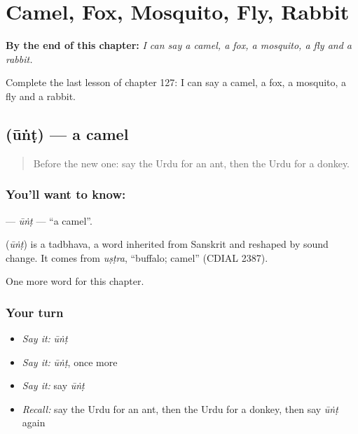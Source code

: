 
\chapter{Camel, Fox, Mosquito, Fly, Rabbit}
\label{ch:ur-camel-fox-mosquito-fly-rabbit}

\begin{chapteropening}
\textbf{By the end of this chapter:} \emph{I can say a camel, a fox, a mosquito, a fly and a rabbit.}

Complete the last lesson of chapter 127: I can say a camel, a fox, a mosquito, a fly and a rabbit.
\end{chapteropening}

\section[\texorpdfstring{\ur{اونٹ} (ūṅṭ)}{اونٹ (ūṅṭ)}]{ (ūṅṭ) — a camel}

\label{lesson:UR-C127-unt}



\begin{quote}
Before the new one: say the Urdu for an ant, then the Urdu for a donkey.
\end{quote}

\subsection*{You'll want to know: }
\textbf{} — \emph{ūṅṭ} — \textquotedblleft{}a camel\textquotedblright{}.

\begin{cousinweb}
\textbf{} (\emph{ūṅṭ}) is a tadbhava, a word inherited from Sanskrit and reshaped by sound change. It comes from \emph{uṣṭra}, \textquotedblleft{}buffalo; camel\textquotedblright{} (CDIAL 2387).
\end{cousinweb}

\begin{grammarlens}[title={What you've built}]
One more word for this chapter.
\end{grammarlens}

\subsection*{Your turn}
\begin{itemize}
\raggedright
  \item \emph{Say it:} \emph{ūṅṭ}
  \item \emph{Say it:} \emph{ūṅṭ}, once more
  \item \emph{Say it:} say \emph{ūṅṭ}
  \item \emph{Recall:} say the Urdu for an ant, then the Urdu for a donkey, then say \emph{ūṅṭ} again
\end{itemize}

